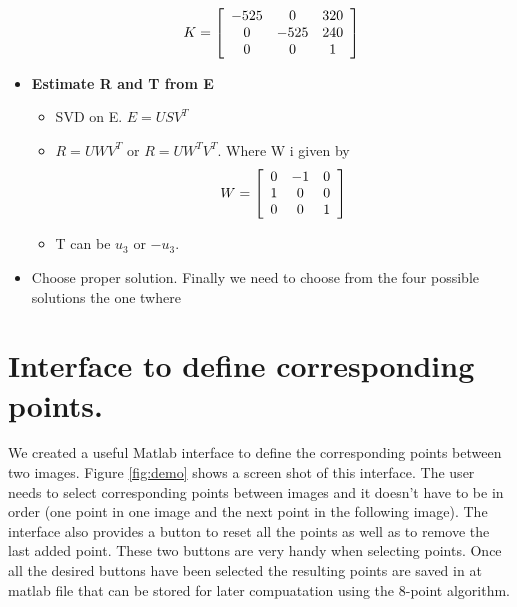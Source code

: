 \documentclass[a4paper,12pt]{article}
\begin{document}
\begin{itemize}
            \begin{equation}
                       K = \left[ 
            \begin{array}[]{ccc}
                        -525 & 0 & 320 \\
                        0 & -525 & 240 \\
                        0 & 0 & 1 \\
                    \end{array}
            \right] 
            \end{equation}
        \item \textbf{Estimate R and T from E}
            \begin{itemize}
                \item SVD on E. $E = USV^T$
                \item $R  = UWV^T$ or $R = UW^TV^T$. Where W i given by 
                    \begin{equation}
                        W = \left [ 
                            \begin{array}[]{ccc}
                                0 & -1 & 0  \\
                                1 & 0 & 0   \\
                                0 & 0 & 1
                            \end{array}
                            \right ] 
                    \end{equation}
                \item T can be $u_3$ or $-u_3$.
            \end{itemize}
        \item {Choose proper solution}. Finally we need to choose from the four
            possible solutions the one twhere 
    \end{itemize}

    \section{Interface to define corresponding points.}
    We created a useful Matlab interface to define the corresponding points between two images.
    Figure \ref{fig:demo} shows a screen shot of this interface. The user needs to select
    corresponding points between images and it doesn't have to be in order (one point in one
    image and the next point in the following image). The interface also provides a button to
    reset all the points as well as to remove the last added point. These two buttons are
    very handy when selecting points. Once all the desired buttons have been selected the 
    resulting points are saved in at matlab file that can be stored for later compuatation
    using the 8-point algorithm. 
\end{document}
